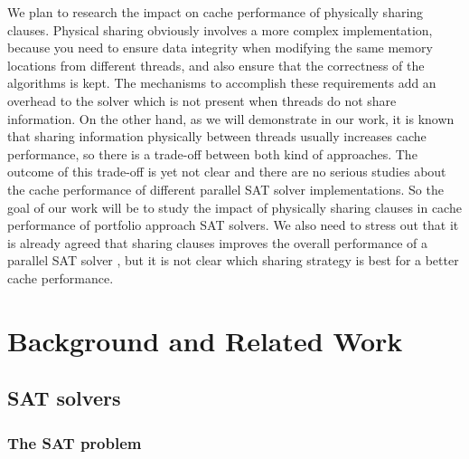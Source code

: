 \documentclass[12pt]{diicc}
\begin{document}
We plan to research the impact on cache performance of physically sharing clauses. Physical sharing obviously involves a more complex implementation, because you need to ensure data integrity when modifying the same memory locations from different threads, and also ensure that the correctness of the algorithms is kept. The mechanisms to accomplish these requirements add an overhead to the solver which is not present when threads do not share information. On the other hand, as we will demonstrate in our work, it is known that sharing information physically between threads usually increases cache performance, so there is a trade-off between both kind of approaches. The outcome of this trade-off is yet not clear and there are no serious studies about the cache performance of different parallel SAT solver implementations. So the goal of our work will be to study the impact of physically sharing clauses in cache performance of portfolio approach SAT solvers. We also need to stress out that it is already agreed that sharing clauses improves the overall performance of a parallel SAT solver \cite{overview}, but it is not clear which sharing strategy is best for a better cache performance.




%
% 
\chapter{Background and Related Work}\label{chap:background}
\section{SAT solvers}

\subsection{The SAT problem}
\end{document}
